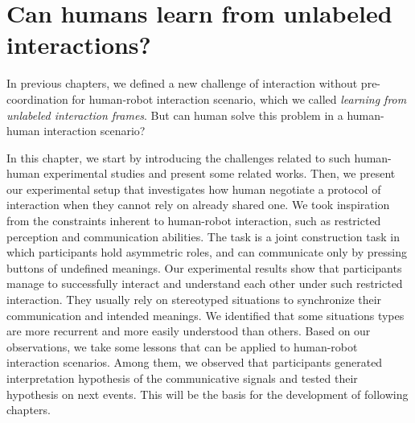 
\chapter{Can humans learn from unlabeled interactions?}
\label{chapter:humanexperiment}
\minitoc


In previous chapters, we defined a new challenge of interaction without pre-coordination for human-robot interaction scenario, which we called \emph{learning from unlabeled interaction frames}. But can human solve this problem in a human-human interaction scenario?

In this chapter, we start by introducing the challenges related to such human-human experimental studies and present some related works. Then, we present our experimental setup that investigates how human negotiate a protocol of interaction when they cannot rely on already shared one. We took inspiration from the constraints inherent to human-robot interaction, such as restricted perception and communication abilities. The task is a joint construction task in which participants hold asymmetric roles, and can communicate only by pressing buttons of undefined meanings. Our experimental results show that participants manage to successfully interact and understand each other under such restricted interaction. They usually rely on stereotyped situations to synchronize their communication and intended meanings. We identified that some situations types are more recurrent and more easily understood than others. Based on our observations, we take some lessons that can be applied to human-robot interaction scenarios. Among them, we observed that participants generated interpretation hypothesis of the communicative signals and tested their hypothesis on next events. This will be the basis for the development of following chapters. 

